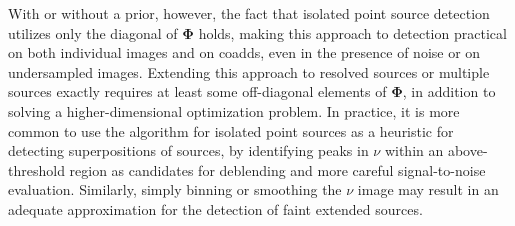 \documentclass[10pt]{article}
\begin{document}
With or without a prior, however, the fact that isolated point source detection utilizes only the diagonal of $\bm{\Phi}$ holds, making this approach to detection practical on both individual images and on coadds, even in the presence of noise or on undersampled images.  Extending this approach to resolved sources or multiple sources exactly requires at least some off-diagonal elements of $\bm{\Phi}$, in addition to solving a higher-dimensional optimization problem.  In practice, it is more common to use the algorithm for isolated point sources as a heuristic for detecting superpositions of sources, by identifying peaks in $\nu$ within an above-threshold region as candidates for deblending and more careful signal-to-noise evaluation.  Similarly, simply binning or smoothing the $\nu$ image may result in an adequate approximation for the detection of faint extended sources.




\end{document}
